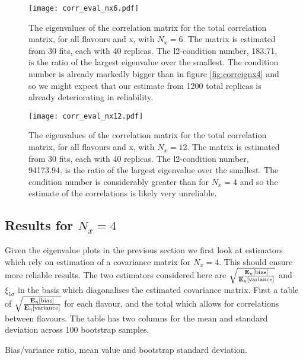 \begin{figure}[]
    \centering
    \texttt{[image: corr\_eval\_nx6.pdf]}
    \caption{The eigenvalues of the correlation matrix for the total correlation
    matrix, for all flavours and x, with $N_x=6$. The matrix is estimated from
    30 fits, each with 40 replicas.
    The l2-condition number, 183.71, is the ratio of the
    largest eigenvalue over the smallest. The condition number is already markedly
    bigger than in figure \ref{fig:correignx4} and so we might expect that
    our estimate from 1200 total replicas is already deteriorating in reliability.}
    \label{fig:correignx6}
\end{figure}

\begin{figure}[]
    \centering
    \texttt{[image: corr\_eval\_nx12.pdf]}
    \caption{The eigenvalues of the correlation matrix for the total correlation
    matrix, for all flavours and x, with $N_x=12$. The matrix is estimated from
    30 fits, each with 40 replicas.
    The l2-condition number, 94173.94, is the ratio of the
    largest eigenvalue over the smallest. The condition number is considerably
    greater than for $N_x=4$ and so the estimate of the correlations is likely
    very unreliable.}
    \label{fig:correignx12}
\end{figure}

\FloatBarrier

\subsection{Results for $N_x=4$}

Given the eigenvalue plots in the previous section we first look at estimators
which rely on estimation of a covariance matrix for $N_x=4$. This should ensure
more reliable results. The two estimators considered here are
$\sqrt{\frac{\mathbf{E}_{\eta}\left[ {\rm bias} \right]}{\mathbf{E}_{\eta}\left[ {\rm variance} \right]}}$ and $\xi_{1\sigma}$ in the basis
which diagonalises the estimated covariance matrix. First a table of
$\sqrt{\frac{\mathbf{E}_{\eta}\left[ {\rm bias} \right]}{\mathbf{E}_{\eta}\left[ {\rm variance} \right]}}$ for each flavour, and the total
which allows for correlations between flavours. The table has two columns
for the mean and standard deviation across 100 bootstrap samples.

\begin{table}[h!]
    \label{tab:pdf_sqrt_ratio_nx4}
    
    \caption{Bias/variance ratio, mean value and bootstrap standard deviation. }
\end{table}

